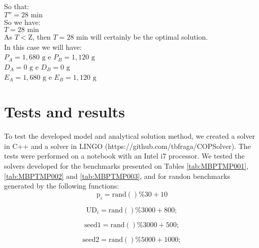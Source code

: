 \documentclass[authoryear,preprint,12pt]{elsarticle}
\begin{document}
So that: \\

$T'' = 28 \textrm{ min}$ \\

So we have: \\

$T = 28 \textrm{ min}$ \\

As $T<\textrm{Z}$, then $T = 28 \textrm{ min}$ will certainly be the optimal solution. \\

In this case we will have: \\

$P_A = 1,680  \textrm{ g}$ e $P_B=1,120 \textrm{ g}$ \\

$D_A = 0 \textrm{ g}$ e $D_B = 0 \textrm{ g}$ \\

$E_A = 1,680 \textrm{ g}$ e $E_B = 1,120 \textrm{ g}$ \\

\section{Tests and results}
\label{sec:results}

To test the developed model and analytical solution method, we created a solver in C++ and a solver in LINGO (https://github.com/tbfraga/COPSolver). The tests were performed on a notebook with an Intel i7 processor. We tested the solvers developed for the benchmarks presented on Tables \ref{tab:MBPTMP001}, \ref{tab:MBPTMP002} and \ref{tab:MBPTMP003}, and for randon benchmarks generated by the following functions: \\

\begin{equation}
\textrm{p}_i = \textrm{rand}()\%30 + 10
\end{equation}

\begin{equation}
\textrm{UD}_i = \textrm{rand}()\%3000 + 800;
\end{equation}

\begin{equation}
 \textrm{seed1} = \textrm{rand}()\%3000 + 500;
\end{equation}

\begin{equation}
\textrm{seed2} = \textrm{rand}()\%5000 + 1000;
\end{equation}
\end{document}
